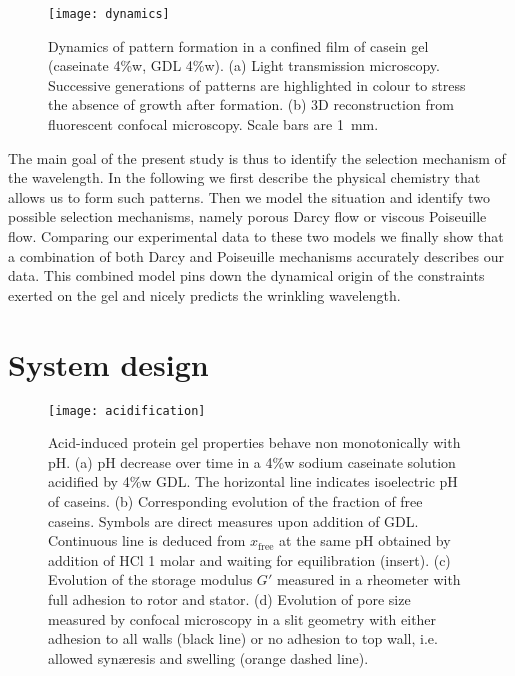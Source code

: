 \documentclass[twocolumn,superscriptaddress,showpacs,preprintnumbers,
amsmath,amssymb,prl]{revtex4-1}
\begin{document}
\begin{figure}[ht!]
	\texttt{[image: dynamics]}%
	\caption{Dynamics of pattern formation in a confined film of casein gel (caseinate 4\%w, GDL 4\%w). (a) Light transmission microscopy. Successive generations of patterns are highlighted in colour to stress the absence of growth after formation. (b) 3D reconstruction from fluorescent confocal microscopy. Scale bars are \SI{1}{\milli\metre}.}%
	\label{fig:dynamics}%
\end{figure}

The main goal of the present study is thus to identify the selection mechanism of the wavelength. In the following we first describe the physical chemistry that allows us to form such patterns. Then we  model the situation and identify two possible selection mechanisms, namely porous Darcy flow or viscous Poiseuille flow. Comparing our experimental data to these two models we finally show that a combination of both Darcy and Poiseuille mechanisms accurately describes our data. This combined model pins down the dynamical origin of the constraints exerted on the gel and nicely predicts the wrinkling wavelength.

\section*{System design}

\begin{figure}
	\texttt{[image: acidification]}%
	\caption{Acid-induced protein gel properties behave non monotonically with pH. (a) pH decrease over time in a 4\%w sodium caseinate solution acidified by 4\%w GDL. The horizontal line indicates isoelectric pH of caseins. (b) Corresponding evolution of the fraction of free caseins. Symbols are direct measures upon addition of GDL. Continuous line is deduced from $x_\text{free}$ at the same pH obtained by addition of HCl 1 molar and waiting for equilibration (insert). (c) Evolution of the storage modulus $G'$ measured in a rheometer with full adhesion to rotor and stator. (d) Evolution of pore size measured by confocal microscopy in a slit geometry with either adhesion to all walls (black line) or no adhesion to top wall, i.e. allowed syn\ae{}resis and swelling (orange dashed line).}%
	\label{fig:acidification}
\end{figure}
\end{document}
